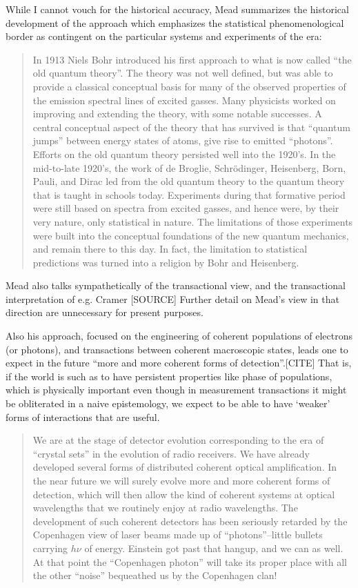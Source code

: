 \documentclass{article}
\begin{document}
While I cannot vouch for the historical accuracy, Mead summarizes the historical development of the approach which emphasizes the statistical phenomenological border as contingent on the particular systems and experiments of the era:

\begin{quote}
    In 1913 Niels Bohr introduced his first approach to what is now called ``the old quantum theory''. The theory was not well defined, but was able to provide a classical conceptual basis for many of the observed properties of the emission spectral lines of excited gasses. Many physicists worked on improving and extending the theory, with some notable successes. A central conceptual aspect of the theory that has survived is that ``quantum jumps'' between energy states of atoms, give rise to emitted ``photons''. Efforts on the old quantum theory persisted well into the 1920’s. In the mid-to-late 1920’s, the work of de Broglie, Schr\"odinger, Heisenberg, Born, Pauli, and Dirac led from the old quantum theory to the quantum theory that is taught in schools today. Experiments during that formative period were still based on spectra from excited gasses, and hence were, by their very nature, only statistical in nature. The limitations of those experiments were built into the conceptual foundations of the new quantum mechanics, and remain there to this day. In fact, the limitation to statistical predictions was turned into a religion by Bohr and Heisenberg.
\end{quote}

Mead also talks sympathetically of the transactional view, and the transactional interpretation of e.g. Cramer [SOURCE]  Further detail on Mead's view in that direction are unnecessary for present purposes.


Also his approach, focused on the engineering of coherent populations of electrons (or photons), and transactions between coherent macroscopic states, leads one to expect in the future ``more and more coherent forms of detection''.[CITE]  That is, if the world is such as to have persistent properties like phase of populations, which is physically important even though in measurement transactions it might be obliterated in a naive epistemology, we expect to be able to have `weaker' forms of interactions that are useful.  

\begin{quote}
    We are at the stage of detector evolution corresponding to the era of ``crystal sets'' in the evolution of radio receivers. We have already developed several forms of distributed coherent optical amplification. In the near future we will surely evolve more and more coherent forms of detection, which will then allow the kind of coherent systems at optical wavelengths that we routinely enjoy at radio wavelengths. The development of such coherent detectors has been seriously retarded by the Copenhagen view of laser beams made up of ``photons''–little bullets carrying $h\nu$ of energy. Einstein got past that hangup, and we can as well. At that point the ``Copenhagen photon'' will take its proper place with all the other ``noise'' bequeathed us by the Copenhagen clan!
\end{quote}
\end{document}
